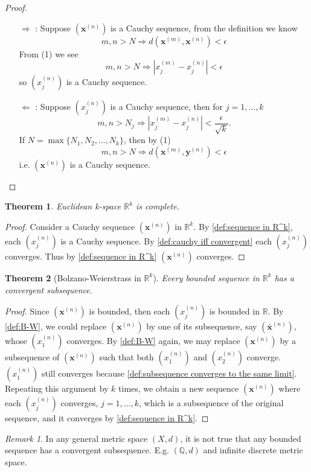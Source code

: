 \documentclass[12pt, lettersize]{book}
\theoremstyle{plain}
\newtheorem{thm}{Theorem}[section]
\theoremstyle{definition}
\theoremstyle{remark}
\newtheorem*{rem}{Remark}
\newcommand{\R}{\mathbb{R}}
\newcommand{\Q}{\mathbb{Q}}
\begin{document}
\begin{proof}
\begin{itemize}
				\item[$\Rightarrow$]: Suppose $(\textbf{x}^{(n)})$ is a Cauchy sequence, from the definition we know
				\begin{displaymath}
					m,n>N\Rightarrow d(\textbf{x}^{(m)},\textbf{x}^{(n)})<\epsilon
				\end{displaymath}
				From (1) we see
				\begin{displaymath}
					m,n>N\Rightarrow|x_j^{(m)}-x_j^{(n)}|<\epsilon
				\end{displaymath}
				so $(x_j^{(n)})$ is a Cauchy sequence.
				\item[$\Leftarrow$]: Suppose $(x_j^{(n)})$ is a Cauchy sequence, then for $j=1,\dots,k$
				\begin{displaymath}
					m,n>N_j\Rightarrow|x_j^{(m)}-x_j^{(n)}|<\frac{\epsilon}{\sqrt{k}}.
				\end{displaymath}
				If $N=\max\{N_1,N_2,\dots,N_k\}$, then by (1)
				\begin{displaymath}
					m,n>N\Rightarrow d(\textbf{x}^{(m)},\textbf{y}^{(n)})<\epsilon
				\end{displaymath}
				i.e. $(\textbf{x}^{(n)})$ is a Cauchy sequence.
			\end{itemize}
		\end{proof}
		
		\begin{thm}
			Euclidean k-space $\mathbb{R}^k$ is complete.
		\end{thm}
		\begin{proof}
			Consider a Cauchy sequence $(\textbf{x}^{(n)})$ in $\mathbb{R}^k$. By \ref{def:sequence in R^k}, each $(x_j^{(n)})$ is a Cauchy sequence. By \ref{def:cauchy iff convergent} each $(x_j^{(n)})$ converges. Thus by \ref{def:sequence in R^k} $(\textbf{x}^{(n)})$ converges.
		\end{proof}
		
		\begin{thm}[Bolzano-Weierstrass in $\R^k$]
			Every bounded sequence in $\mathbb{R}^k$ has a convergent subsequence.
		\end{thm}
		\begin{proof}
			Since $(\textbf{x}^{(n)})$ is bounded, then each $(x_j^{(n)})$ is bounded in $\mathbb{R}$. By \ref{def:B-W}, we
			could replace $(\textbf{x}^{(n)})$ by one of its subsequence, say $(\bar{\mathbf{x}}^{(n)})$, whose $(x_1^{(n)})$
			converges. By \ref{def:B-W} again, we may replace $(\textbf{x}^{(n)})$ by a subsequence of $(\textbf{x}^{(n)})$ such
			that both $(x_1^{(n)})$ and $(x_2^{(n)})$ converge. $(x_1^{(n)})$ still converges because \ref{def:subsequence converges to the same limit}. Repeating this argument by $k$ times, we obtain a new sequence $(\textbf{x}^{(n)})$ where each $(x_j^{(n)})$ converges, $j=1,\dots,k$, which is a subsequence of the original sequence, and it converges by \ref{def:sequence in R^k}. 
		\end{proof}
		\begin{rem}
			In any general metric space $(X,d)$, it is not true that any bounded sequence has a convergent subsequence. E.g. $(\Q,d)$ and infinite discrete metric space.
		\end{rem}
		
\end{document}

